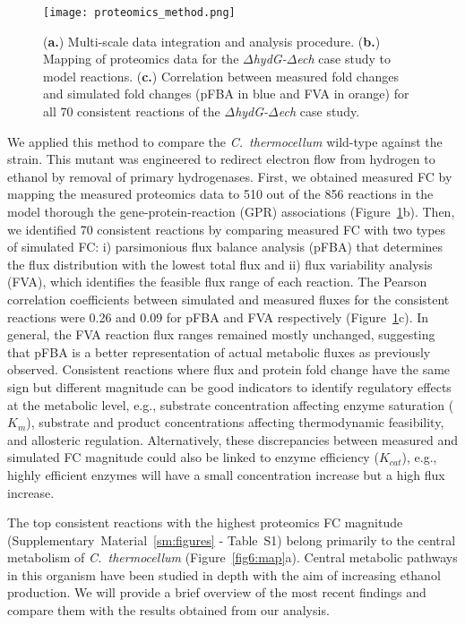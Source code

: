 \begin{figure}[hp]
    \centering
    \texttt{[image: proteomics\_method.png]}
    \caption[Multi-scale data integration procedure]{(\textbf{a.}) Multi-scale data integration and analysis procedure. (\textbf{b.}) Mapping of proteomics data for the \textit{$\Delta$hydG-$\Delta$ech} case study to model reactions. (\textbf{c.}) Correlation between measured fold changes and simulated fold changes (pFBA in blue and FVA in orange) for all 70 consistent reactions of the \textit{$\Delta$hydG-$\Delta$ech} case study.}
    \label{fig6:proteomics}
\end{figure}

We applied this method to compare the \textit{C.~thermocellum} wild-type against the  strain. This mutant was engineered to redirect electron flow from hydrogen to ethanol by removal of primary hydrogenases.\citep{biswas2015, thompson2015}
First, we obtained measured FC by mapping the measured proteomics data to 510 out of the 856 reactions in the model thorough the gene-protein-reaction (GPR) associations (Figure~\ref{fig6:proteomics}b).
Then, we identified 70 consistent reactions by comparing measured FC with two types of simulated FC: i) parsimonious flux balance analysis (pFBA) that determines the flux distribution with the lowest total flux and ii) flux variability analysis (FVA), which identifies the feasible flux range of each reaction.
The Pearson correlation coefficients between simulated and measured fluxes for the consistent reactions were 0.26 and 0.09 for pFBA and FVA respectively (Figure~\ref{fig6:proteomics}c).
In general, the FVA reaction flux ranges remained mostly unchanged, suggesting that pFBA is a better representation of actual metabolic fluxes as previously observed.\citep{machado2014}
Consistent reactions where flux and protein fold change have the same sign but different magnitude can be good indicators to identify regulatory effects at the metabolic level, e.g., substrate concentration affecting enzyme saturation ($K_m$), substrate and product concentrations affecting thermodynamic feasibility, and allosteric regulation. Alternatively, these discrepancies between measured and simulated FC magnitude could also be linked to enzyme efficiency ($K_{cat}$), e.g., highly efficient enzymes will have a small concentration increase  but a high flux increase.


The top consistent reactions with the highest proteomics FC magnitude (Supplementary~Material~\ref{sm:figures} - Table~S1) belong primarily to the central metabolism of \textit{C.~thermocellum} (Figure~\ref{fig6:map}a). Central metabolic pathways in this organism have been studied in depth with the aim of increasing ethanol production. We will provide a brief overview of the most recent findings and compare them with the results obtained from our analysis.

